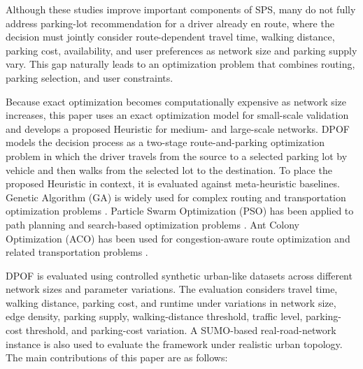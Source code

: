 Although these studies improve important components of SPS, many do not fully address parking-lot recommendation for a driver already en route, where the decision must jointly consider route-dependent travel time, walking distance, parking cost, availability, and user preferences as network size and parking supply vary. This gap naturally leads to an optimization problem that combines routing, parking selection, and user constraints.

Because exact optimization becomes computationally expensive as network size increases, this paper uses an exact optimization model for small-scale validation and develops a proposed Heuristic for medium- and large-scale networks. DPOF models the decision process as a two-stage route-and-parking optimization problem in which the driver travels from the source to a selected parking lot by vehicle and then walks from the selected lot to the destination. To place the proposed Heuristic in context, it is evaluated against meta-heuristic baselines. Genetic Algorithm (GA) is widely used for complex routing and transportation optimization problems \cite{ref18}. Particle Swarm Optimization (PSO) has been applied to path planning and search-based optimization problems \cite{ref19}. Ant Colony Optimization (ACO) has been used for congestion-aware route optimization and related transportation problems \cite{ref20}.

DPOF is evaluated using controlled synthetic urban-like datasets across different network sizes and parameter variations. The evaluation considers travel time, walking distance, parking cost, and runtime under variations in network size, edge density, parking supply, walking-distance threshold, traffic level, parking-cost threshold, and parking-cost variation. A SUMO-based real-road-network instance is also used to evaluate the framework under realistic urban topology. The main contributions of this paper are as follows:

